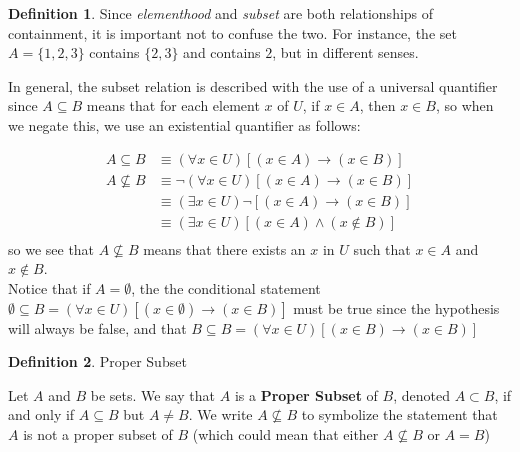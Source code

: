 \documentclass{book}
\theoremstyle{definition}
\newtheorem{definition}{Definition}[section]
\theoremstyle{remark}
\begin{document}
\begin{definition}
    Since \textit{elementhood} and \textit{subset} are both relationships of containment, it is important not to confuse the two. For instance, the set $A = \{ 1, 2 , 3 \}$ contains $\{ 2, 3 \}$ and contains $2$, but in different senses. 
    
    In general, the subset relation is described with the use of a universal quantifier since $A \subseteq B$ means that for each element $x$ of $U$, if $x \in A$, then $x \in B$, so when we negate this, we use an existential quantifier  as follows: 
    
    \begin{align*}
    A \subseteq B & \equiv (\forall x \in U) [(x \in A) \to (x \in B)] \nonumber \\
    A \nsubseteq B & \equiv \neg (\forall x \in U) [(x \in A) \to (x \in B)] \nonumber\\
           & \equiv (\exists x \in U) \neg [(x \in A) \to (x \in B)] \nonumber\\
           & \equiv (\exists x \in U) [(x \in A) \wedge (x \notin B)] \nonumber\\
    \end{align*}
    so we see that $A \nsubseteq B$ means  that there exists an $x$ in $U$ such that $x \in A$ and $x \notin B$. \\
    
    Notice that if $A = \emptyset$, the the conditional statement $ \emptyset \subseteq B = (\forall x \in U) [(x \in \emptyset) \to (x \in B)]$ must be true since the hypothesis will always be false, and that  $B \subseteq B = (\forall x \in U) [(x \in B) \to (x \in B)]$

\end{definition}


\begin{definition}
Proper Subset \\

    \begin{tcolorbox}
        Let $A$ and $B$ be sets. We say that $A$ is a \textbf{Proper Subset} of $B$, denoted $A \subset B$, if and only if $A \subseteq B$ but $A \neq B$. We write $A \nsubseteq B$ to symbolize the statement that $A$ is not a proper subset of $B$ (which could mean that either $A \nsubseteq B$ or $A = B$)
    \end{tcolorbox}
    \end{definition}
    
\end{document}

